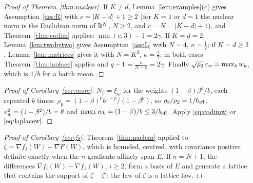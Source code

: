 \begin{proof}[Proof of Theorem~\ref{thm:nuclear}]
If $K\ne d$, Lemma~\ref{lem:examples}(c) gives Assumption~\ref{ass:R} with $c=|K-d|+1\ge2$ (for $K=1$ or $d=1$ the nuclear
norm is the Euclidean norm of $\mathbb{R}^N$, $N\ge2$, and $c=N=|K-d|+1$), and Theorem~\ref{thm:codim} applies:
$\min(c,3)-1=2\gamma$. If $K=d=2$, Lemma~\ref{lem:twobytwo} gives Assumption~\ref{ass:L} with $N=4$, $\kappa=\frac12$; if
$K=d\ge3$, Lemma~\ref{lem:matrices} gives it with $N=K^2$, $\kappa=\frac12$; in both cases Theorem~\ref{thm:laplace}
applies and $q-1=\frac{\kappa}{N-\kappa}=2\gamma$. Finally $\sqrt{\rho_2}\,\varepsilon_w=\max_kw_k$, which is $1/b$ for a batch mean.
\end{proof}

\begin{proof}[Proof of Corollary~\ref{cor:mom}]
$N_\beta=\xi_w$ for the weights $(1-\beta)\beta^k/b$, each repeated $b$ times: $\rho_p=(1-\beta)^pb^{1-p}/(1-\beta^p)$,
so $\rho_3/\rho_2=1/b_{\mathrm{eff}}$, $\varepsilon_w^2=(1-\beta^2)/b=\theta$ and $\max_kw_k=(1-\beta)/b\le3/b_{\mathrm{eff}}$. Apply
\eqref{eq:codimw} or \eqref{eq:laplacew}.
\end{proof}

\begin{proof}[Proof of Corollary~\ref{cor:fs}]
Theorem~\ref{thm:nuclear} applied to $\zeta=\nabla f_I(W)-\nabla F(W)$, which is bounded, centred, with covariance
positive definite exactly when the $n$ gradients affinely span $E$. If $n=N+1$, the differences
$\nabla f_i(W)-\nabla f_1(W)$, $i\ge2$, form a basis of $E$ and generate a lattice that contains the support of
$\zeta-\zeta'$: the law of $\zeta$ is a lattice law.
\end{proof}
